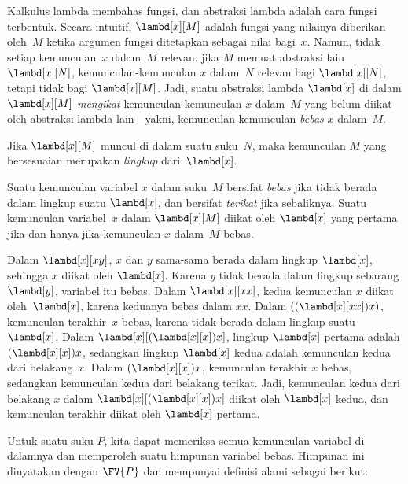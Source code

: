 \documentclass[../../../include/open-logic-section]{subfiles}
\begin{document}

Kalkulus lambda membahas fungsi, dan abstraksi lambda adalah cara fungsi
terbentuk. Secara intuitif, $\lambd[x][M]$ adalah fungsi yang nilainya
diberikan oleh~$M$ ketika argumen fungsi ditetapkan sebagai nilai bagi~$x$.
Namun, tidak
setiap kemunculan~$x$ dalam~$M$ relevan: jika $M$ memuat abstraksi lain
$\lambd[x][N]$, kemunculan-kemunculan $x$ dalam~$N$ relevan bagi
$\lambd[x][N]$, tetapi tidak bagi $\lambd[x][M]$. Jadi, suatu abstraksi lambda
$\lambd[x]$ di dalam $\lambd[x][M]$ \emph{mengikat} kemunculan-kemunculan $x$
dalam~$M$ yang belum diikat oleh abstraksi lambda lain---yakni,
kemunculan-kemunculan \emph{bebas} $x$ dalam~$M$.

\begin{defn}[Lingkup]
Jika $\lambd[x][M]$ muncul di dalam suatu suku~$N$, maka kemunculan $M$ yang
bersesuaian merupakan \emph{lingkup} dari~$\lambd[x]$.
\end{defn}


\begin{defn}
  Suatu kemunculan variabel $x$ dalam suku~$M$ bersifat \emph{bebas} jika
  tidak berada dalam lingkup suatu $\lambd[x]$, dan bersifat \emph{terikat}
  jika sebaliknya. Suatu kemunculan variabel~$x$ dalam $\lambd[x][M]$ diikat
  oleh $\lambd[x]$ yang pertama jika dan hanya jika kemunculan $x$ dalam~$M$
  bebas.
\end{defn}

\begin{ex}
  Dalam $\lambd[x][x y]$, $x$ dan $y$ sama-sama berada dalam lingkup
  $\lambd[x]$, sehingga $x$ diikat oleh $\lambd[x]$. Karena $y$ tidak berada
  dalam lingkup sebarang $\lambd[y]$, variabel itu bebas. Dalam
  $\lambd[x][x x]$, kedua kemunculan $x$ diikat oleh~$\lambd[x]$, karena
  keduanya bebas dalam
  $xx$. Dalam $((\lambd[x][xx])x)$, kemunculan terakhir~$x$ bebas, karena
  tidak berada dalam lingkup suatu $\lambd[x]$. Dalam
  $\lambd[x][(\lambd[x][x])x]$, lingkup $\lambd[x]$ pertama adalah
  $(\lambd[x][x])x$, sedangkan lingkup $\lambd[x]$ kedua adalah kemunculan
  kedua dari belakang~$x$. Dalam $(\lambd[x][x])x$, kemunculan terakhir $x$
  bebas, sedangkan kemunculan kedua dari belakang terikat. Jadi, kemunculan
  kedua dari belakang $x$ dalam $\lambd[x][(\lambd[x][x])x]$ diikat oleh
  $\lambd[x]$ kedua, dan kemunculan terakhir diikat oleh $\lambd[x]$ pertama.
\end{ex}

Untuk suatu suku $P$, kita dapat memeriksa semua kemunculan variabel di
dalamnya dan memperoleh suatu himpunan variabel bebas. Himpunan ini dinyatakan
dengan $\FV{P}$ dan mempunyai definisi alami sebagai berikut:
\end{document}
